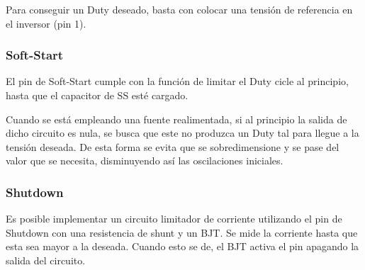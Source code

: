 Para conseguir un Duty deseado, basta con colocar una tensión de referencia en el inversor (pin 1).

\subsubsection{Soft-Start}

El pin de Soft-Start cumple con la función de limitar el Duty cicle al principio, hasta que el capacitor de SS esté cargado. %

Cuando se está empleando una fuente realimentada, si al principio la salida de dicho circuito es nula, se busca que este no produzca un Duty tal para llegue a la tensión deseada. De esta forma se evita que se sobredimensione y se pase del valor que se necesita, disminuyendo así las oscilaciones iniciales.


\subsubsection{Shutdown}

Es posible implementar un circuito limitador de corriente utilizando el pin de Shutdown con una resistencia de shunt y un BJT. Se mide la corriente hasta que esta sea mayor a la deseada. Cuando esto se de, el BJT activa el pin apagando la salida del circuito.

%